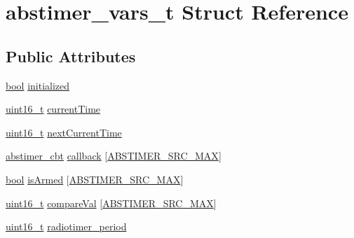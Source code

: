\hypertarget{structabstimer__vars__t}{}\section{abstimer\+\_\+vars\+\_\+t Struct Reference}
\label{structabstimer__vars__t}
\subsection*{Public Attributes}
\begin{DoxyCompactItemize}
\item 
\hyperlink{_p_e___types_8h_a97a80ca1602ebf2303258971a2c938e2}{bool} \hyperlink{structabstimer__vars__t_ae5ac4e9c7a89a73cc062a117e174f95a}{initialized}
\item 
\hyperlink{_p_e___types_8h_a1f1825b69244eb3ad2c7165ddc99c956}{uint16\+\_\+t} \hyperlink{structabstimer__vars__t_af445fceae21f678f000d9f33c8515530}{current\+Time}
\item 
\hyperlink{_p_e___types_8h_a1f1825b69244eb3ad2c7165ddc99c956}{uint16\+\_\+t} \hyperlink{structabstimer__vars__t_a94565da5d1736339a478ce18186e92d9}{next\+Current\+Time}
\item 
\hyperlink{k20_2bsp_2radiotimer_8c_ab0bc168cafa483dee0dc77d184fba1d1}{abstimer\+\_\+cbt} \hyperlink{structabstimer__vars__t_a278b88ac381a927dbb5a6bbe4a7541ab}{callback} \mbox{[}\hyperlink{k20_2bsp_2radiotimer_8c_a0dd1b7fa75925f96618ae9558aedc4dcab98b50bf61c9f1f51ec0c9d71327652b}{A\+B\+S\+T\+I\+M\+E\+R\+\_\+\+S\+R\+C\+\_\+\+M\+AX}\mbox{]}
\item 
\hyperlink{_p_e___types_8h_a97a80ca1602ebf2303258971a2c938e2}{bool} \hyperlink{structabstimer__vars__t_afce882cb29c654e7d2ebe2cad98f205d}{is\+Armed} \mbox{[}\hyperlink{k20_2bsp_2radiotimer_8c_a0dd1b7fa75925f96618ae9558aedc4dcab98b50bf61c9f1f51ec0c9d71327652b}{A\+B\+S\+T\+I\+M\+E\+R\+\_\+\+S\+R\+C\+\_\+\+M\+AX}\mbox{]}
\item 
\hyperlink{_p_e___types_8h_a1f1825b69244eb3ad2c7165ddc99c956}{uint16\+\_\+t} \hyperlink{structabstimer__vars__t_a76de262a0e217980b036ef0c8d930d81}{compare\+Val} \mbox{[}\hyperlink{k20_2bsp_2radiotimer_8c_a0dd1b7fa75925f96618ae9558aedc4dcab98b50bf61c9f1f51ec0c9d71327652b}{A\+B\+S\+T\+I\+M\+E\+R\+\_\+\+S\+R\+C\+\_\+\+M\+AX}\mbox{]}
\item 
\hyperlink{_p_e___types_8h_a1f1825b69244eb3ad2c7165ddc99c956}{uint16\+\_\+t} \hyperlink{structabstimer__vars__t_a7292e4e9c40ca0f867d86f84c7be1144}{radiotimer\+\_\+period}
\item 

\end{DoxyCompactItemize}
